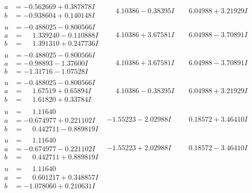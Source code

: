 \documentclass[1p]{elsarticle_modified}
\theoremstyle{definition}
\begin{document}
$$\begin{array}{c|c|c}
\begin{aligned}
a &= -0.562669 + 0.387878 I \\
b &= -0.938604 + 0.140148 I\end{aligned}
 & \phantom{-}4.10386 - 0.38395 I & \phantom{-}6.04988 + 3.21929 I \\ \hline\begin{aligned}
u &= -0.488025 - 0.800566 I \\
a &= \phantom{-}1.339240 - 0.110888 I \\
b &= \phantom{-}1.391310 + 0.247736 I\end{aligned}
 & \phantom{-}4.10386 + 3.67581 I & \phantom{-}6.04988 - 3.70891 I \\ \hline\begin{aligned}
u &= -0.488025 - 0.800566 I \\
a &= -0.98893 - 1.37600 I \\
b &= -1.31716 - 1.07528 I\end{aligned}
 & \phantom{-}4.10386 + 3.67581 I & \phantom{-}6.04988 - 3.70891 I \\ \hline\begin{aligned}
u &= -0.488025 - 0.800566 I \\
a &= \phantom{-}1.67519 + 0.65894 I \\
b &= \phantom{-}1.61820 + 0.33784 I\end{aligned}
 & \phantom{-}4.10386 - 0.38395 I & \phantom{-}6.04988 + 3.21929 I \\ \hline\begin{aligned}
u &= \phantom{-}1.11640\phantom{ +0.000000I} \\
a &= -0.674977 + 0.221102 I \\
b &= \phantom{-}0.442711 - 0.889819 I\end{aligned}
 & -1.55223 - 2.02988 I & \phantom{-}0.18572 + 3.46410 I \\ \hline\begin{aligned}
u &= \phantom{-}1.11640\phantom{ +0.000000I} \\
a &= -0.674977 - 0.221102 I \\
b &= \phantom{-}0.442711 + 0.889819 I\end{aligned}
 & -1.55223 + 2.02988 I & \phantom{-}0.18572 - 3.46410 I \\ \hline\begin{aligned}
u &= \phantom{-}1.11640\phantom{ +0.000000I} \\
a &= \phantom{-}0.601217 + 0.348857 I \\
b &= -1.078060 + 0.210631 I\end{aligned}

\end{array}$$
\end{document}
